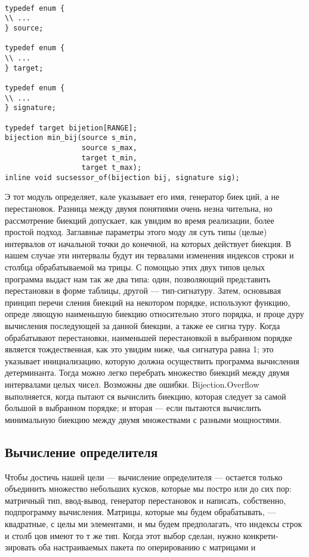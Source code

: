 \documentclass{../../template/mai_book}
\begin{document}
\begin{lstlisting}

typedef enum {
\\ ...
} source;

typedef enum {
\\ ...
} target;

typedef enum {
\\ ...
} signature;

typedef target bijetion[RANGE];
bijection min_bij(source s_min,
				  source s_max, 
				  target t_min,
				  target t_max);
inline void sucsessor_of(bijection bij, signature sig);

\end{lstlisting}
\newpage

Э тот модуль определяет, кале указывает его имя, генератор биек­
ций, а не перестановок. Разница между двумя понятиями очень незна­
чительна, но рассмотрение биекций допускает, как увидим во время
реализации, более простой подход. Заглавные параметры этого моду­
ля суть типы (целые) интервалов от начальной точки до конечной, на
которых действует биекция. В нашем случае эти интервалы будут ин­
тервалами изменения индексов строки и столбца обрабатываемой ма­
трицы. С помощью этих двух типов целых программа выдаст нам так­
же два типа: один, позволяющий представить перестановки в форме
таблицы, другой — тип-сигнатуру. Затем, основывая принцип перечи­
сления биекций на некотором порядке, используют функцию, опреде­
ляющую наименьшую биекцию относительно этого порядка, и проце­
дуру вычисления последующей за данной биекции, а также ее сигна­
туру. Когда обрабатывают перестановки, наименьшей перестановкой
в выбранном порядке является тождественная, как это увидим ниже,
чья сигнатура равна 1; это указывает инициализацию, которую должна
осуществить программа вычисления детерминанта. Тогда можно легко
перебрать множество биекций между двумя интервалами целых чисел.
Возможны две ошибки. Bijection.Overflow выполняется, когда пытают­
ся вычислить биекцию, которая следует за самой большой в выбранном
порядке; и вторая — если пытаются вычислить минимальную биекцию
между двумя множествами с разными мощностями.

\subsection{Вычисление определителя}
Чтобы достичь нашей цели — вычисление определителя — остается
только объединить множество небольших кусков, которые мы постро­
или до сих пор: матричный тип, ввод-вывод, генератор перестановок и
написать, собственно, подпрограмму вычисления.
Матрицы, которые мы будем обрабатывать, — квадратные, с целы­
ми элементами, и мы будем предполагать, что индексы строк и столб­
цов имеют то т же тип. Когда этот выбор сделан, нужно конкрети­
зировать оба настраиваемых пакета по оперированию с матрицами и
\end{document}
